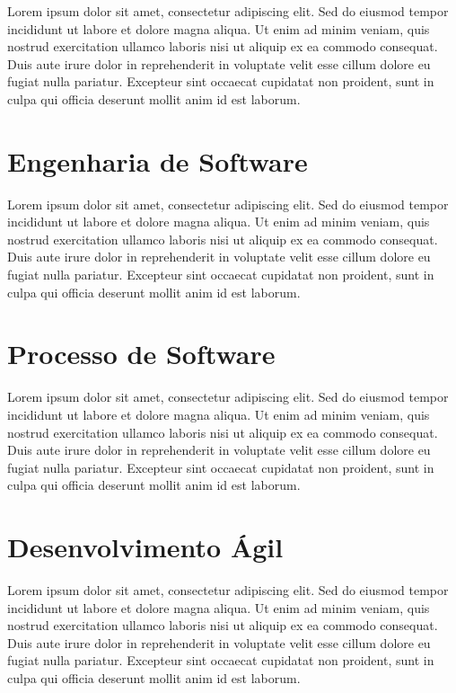 \documentclass[
	12pt,				    %
	openright,			    %
	oneside,			    %
	a4paper,			    %
    sumario=tradicional,    %
	english,			    %
	brazilian,				    %
	]{abntex2}
\begin{document}
Lorem ipsum dolor sit amet, consectetur adipiscing elit. Sed do eiusmod tempor incididunt ut labore et dolore magna aliqua. Ut enim ad minim veniam, quis nostrud exercitation ullamco laboris nisi ut aliquip ex ea commodo consequat. Duis aute irure dolor in reprehenderit in voluptate velit esse cillum dolore eu fugiat nulla pariatur. Excepteur sint occaecat cupidatat non proident, sunt in culpa qui officia deserunt mollit anim id est laborum.

\section{Engenharia de Software}

Lorem ipsum dolor sit amet, consectetur adipiscing elit. Sed do eiusmod tempor incididunt ut labore et dolore magna aliqua. Ut enim ad minim veniam, quis nostrud exercitation ullamco laboris nisi ut aliquip ex ea commodo consequat. Duis aute irure dolor in reprehenderit in voluptate velit esse cillum dolore eu fugiat nulla pariatur. Excepteur sint occaecat cupidatat non proident, sunt in culpa qui officia deserunt mollit anim id est laborum.

\section{Processo de Software}

Lorem ipsum dolor sit amet, consectetur adipiscing elit. Sed do eiusmod tempor incididunt ut labore et dolore magna aliqua. Ut enim ad minim veniam, quis nostrud exercitation ullamco laboris nisi ut aliquip ex ea commodo consequat. Duis aute irure dolor in reprehenderit in voluptate velit esse cillum dolore eu fugiat nulla pariatur. Excepteur sint occaecat cupidatat non proident, sunt in culpa qui officia deserunt mollit anim id est laborum.

\section{Desenvolvimento Ágil}

Lorem ipsum dolor sit amet, consectetur adipiscing elit. Sed do eiusmod tempor incididunt ut labore et dolore magna aliqua. Ut enim ad minim veniam, quis nostrud exercitation ullamco laboris nisi ut aliquip ex ea commodo consequat. Duis aute irure dolor in reprehenderit in voluptate velit esse cillum dolore eu fugiat nulla pariatur. Excepteur sint occaecat cupidatat non proident, sunt in culpa qui officia deserunt mollit anim id est laborum.
\end{document}
